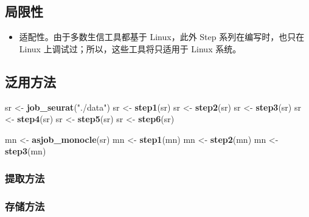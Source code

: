 \documentclass[
]{article}
\newenvironment{Shaded}{\begin{snugshade}}{\end{snugshade}}
\newcommand{\KeywordTok}[1]{\textcolor[rgb]{0.13,0.29,0.53}{\textbf{#1}}}
\newcommand{\NormalTok}[1]{#1}
\newcommand{\StringTok}[1]{\textcolor[rgb]{0.31,0.60,0.02}{#1}}
\providecommand{\tightlist}{%
  \setlength{\itemsep}{0pt}\setlength{\parskip}{0pt}}
\begin{document}
\hypertarget{ux5c40ux9650ux6027}{%
\subsection{局限性}\label{ux5c40ux9650ux6027}}

\begin{itemize}
\tightlist
\item
  适配性。由于多数生信工具都基于 Linux，此外 Step 系列在编写时，也只在 Linux 上调试过；所以，这些工具将只适用于 Linux 系统。
\end{itemize}

\hypertarget{ux6cdbux7528ux65b9ux6cd5}{%
\subsection{泛用方法}\label{ux6cdbux7528ux65b9ux6cd5}}

\begin{Shaded}
\begin{Highlighting}[]
\NormalTok{sr \textless{}{-}}\StringTok{ }\KeywordTok{job\_seurat}\NormalTok{(}\StringTok{"./data"}\NormalTok{)}
\NormalTok{sr \textless{}{-}}\StringTok{ }\KeywordTok{step1}\NormalTok{(sr)}
\NormalTok{sr \textless{}{-}}\StringTok{ }\KeywordTok{step2}\NormalTok{(sr)}
\NormalTok{sr \textless{}{-}}\StringTok{ }\KeywordTok{step3}\NormalTok{(sr)}
\NormalTok{sr \textless{}{-}}\StringTok{ }\KeywordTok{step4}\NormalTok{(sr)}
\NormalTok{sr \textless{}{-}}\StringTok{ }\KeywordTok{step5}\NormalTok{(sr)}
\NormalTok{sr \textless{}{-}}\StringTok{ }\KeywordTok{step6}\NormalTok{(sr)}

\NormalTok{mn \textless{}{-}}\StringTok{ }\KeywordTok{asjob\_monocle}\NormalTok{(sr)}
\NormalTok{mn \textless{}{-}}\StringTok{ }\KeywordTok{step1}\NormalTok{(mn)}
\NormalTok{mn \textless{}{-}}\StringTok{ }\KeywordTok{step2}\NormalTok{(mn)}
\NormalTok{mn \textless{}{-}}\StringTok{ }\KeywordTok{step3}\NormalTok{(mn)}
\end{Highlighting}
\end{Shaded}

\hypertarget{ux63d0ux53d6ux65b9ux6cd5}{%
\subsubsection{提取方法}\label{ux63d0ux53d6ux65b9ux6cd5}}

\hypertarget{ux5b58ux50a8ux65b9ux6cd5}{%
\subsubsection{存储方法}\label{ux5b58ux50a8ux65b9ux6cd5}}
\end{document}
